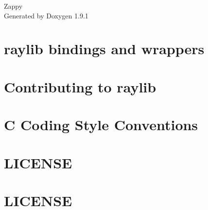\let\mypdfximage\pdfximage\def\pdfximage{\immediate\mypdfximage}\documentclass[twoside]{book}
\newcommand{\+}{\discretionary{\mbox{\scriptsize$\hookleftarrow$}}{}{}}
\newcommand{\clearemptydoublepage}{%
  \newpage{\pagestyle{empty}\cleardoublepage}%
}
\begin{document}
\raggedbottom

\hypersetup{pageanchor=false,
             bookmarksnumbered=true,
             pdfencoding=unicode
            }
\begin{titlepage}
\vspace*{7cm}
\begin{center}%
{\Large Zappy }\\
\vspace*{1cm}
{\large Generated by Doxygen 1.9.1}\\
\end{center}
\end{titlepage}
\clearemptydoublepage
{}
\tableofcontents
\clearemptydoublepage
{}
\hypersetup{pageanchor=true}

\chapter{raylib bindings and wrappers}
\label{md_build__deps_raylib_src_BINDINGS}

\chapter{Contributing to raylib}
\label{md_build__deps_raylib_src_CONTRIBUTING}

\chapter{C Coding Style Conventions}
\label{md_build__deps_raylib_src_CONVENTIONS}

\chapter{LICENSE}
\label{md_build__deps_raylib_src_examples_audio_resources_LICENSE}

\chapter{LICENSE}
\label{md_build__deps_raylib_src_examples_core_resources_LICENSE}

\end{document}
